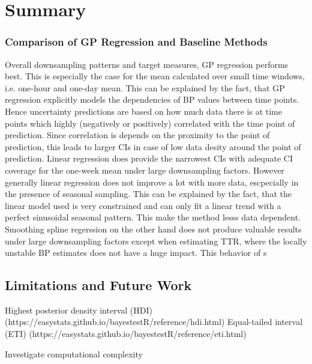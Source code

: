 \chapter{Summary}\label{ch:discussion-and-conclusion}

\subsection{Comparison of GP Regression and Baseline Methods}

Overall downsampling patterns and target measures, GP regression performs best.
This is especially the case for the mean calculated over small time windows, i.e. one-hour and
one-day mean. This can be explained by the fact, that GP regression explicitly
models the dependencies of BP values between time points.
Hence uncertainty predictions
are based on how much data there is at time points which highly (negatively or positively)
correlated with the time point of prediction. Since correlation is depends on
the proximity to the point of prediction, this leads to larger CIs in case
of low data desity around the point of prediction.
Linear regression does provide the narrowest CIs with adequate CI coverage for the
one-week mean under large downsampling factors.
However generally linear regression does not improve a lot with more data, escpecially
in the presence of seasonal sampling.
This can be explained by the fact, that the linear model used is very constrained and
can only fit a linear trend with a perfect sinusoidal seasonal pattern. This
make the method lesss data dependent.
Smoothing spline regerssion  on the other
hand does not produce valuable results under large downsampling factors
except when estimating TTR, where the locally unstable BP estimates does not
have a huge impact. This behavior of s




\section{Limitations and Future Work}


    Highest posterior density interval (HDI) (https://easystats.github.io/bayestestR/reference/hdi.html)
    Equal-tailed interval (ETI) (https://easystats.github.io/bayestestR/reference/eti.html)


Investigate computational complexity


